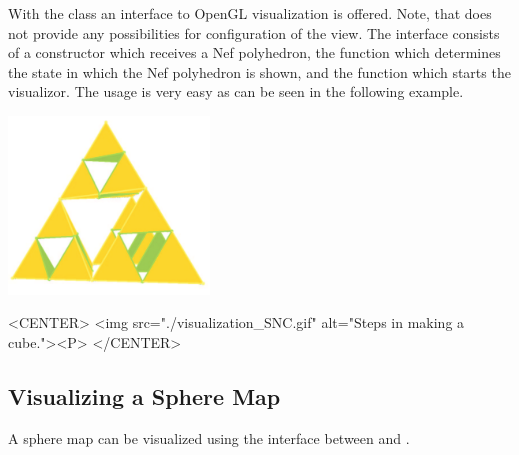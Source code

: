 With the class  an interface to OpenGL 
visualization is offered. Note, that  does not provide
any possibilities for configuration of the view. The interface consists of a
constructor which receives a  Nef polyhedron, the function  which
determines the state in which the Nef polyhedron is shown, and 
the function  which starts the visualizor.
The usage is very easy as can be seen in the following example.

\begin{ccTexOnly}
    \begin{center}
      \parbox{0.4\textwidth}{%
          \includegraphics[width=0.4\textwidth]{Nef_3/fig/visualization_SNC}%
      }
    \end{center}
\end{ccTexOnly}

\begin{ccHtmlOnly}
    <CENTER>
        <img src="./visualization_SNC.gif" alt="Steps in making a cube."><P>
    </CENTER>
\end{ccHtmlOnly}


\subsection{Visualizing a Sphere Map}

A sphere map can be visualized using the interface between 
and .


